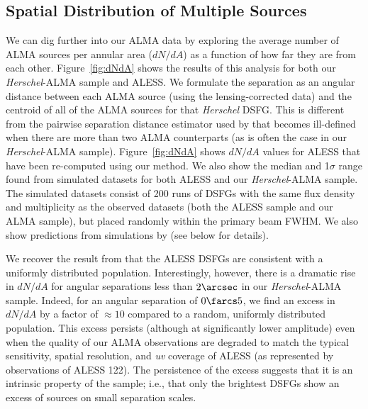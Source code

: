 \documentclass[iop]{emulateapj}
\begin{document}
\subsection{Spatial Distribution of Multiple Sources}\label{sec:spatialdist}

We can dig further into our ALMA data by exploring the average number of ALMA
sources per annular area ($dN/dA$) as a function of how far they are from each
other.  Figure~\ref{fig:dNdA} shows the results of this analysis for both our
{\it Herschel}-ALMA sample and ALESS.  We formulate the separation as an
angular distance between each ALMA source (using the lensing-corrected data)
and the centroid of all of the ALMA sources for that {\it Herschel} DSFG.  This
is different from the pairwise separation distance estimator used by
\citet{Hodge:2013qy} that becomes ill-defined when there are more than two ALMA
counterparts (as is often the case in our {\it Herschel}-ALMA sample).
Figure~\ref{fig:dNdA} shows $dN/dA$ values for ALESS that have been re-computed
using our method.  We also show the median and 1$\sigma$ range found from
simulated datasets for both ALESS and our {\it Herschel}-ALMA sample.  The
simulated datasets consist of 200 runs of DSFGs with the same flux density and
multiplicity as the observed datasets (both the ALESS sample and our ALMA
sample), but placed randomly within the primary beam FWHM.  We also show
predictions from simulations by \citet{HB13} (see below for details).

We recover the result from \citet{Hodge:2013qy} that the ALESS DSFGs are
consistent with a uniformly distributed population.  Interestingly, however,
there is a dramatic rise in $dN/dA$ for angular separations less than
$2\arcsec$ in our {\it Herschel}-ALMA sample.  Indeed, for an angular
separation of $0\farcs5$, we find an excess in $dN/dA$ by a factor of $\approx
10$ compared to a random, uniformly distributed population.  This excess
persists (although at significantly lower amplitude) even when the quality of
our ALMA observations are degraded to match the typical sensitivity, spatial
resolution, and {\it uv} coverage of ALESS (as represented by observations of
ALESS 122).  The persistence of the excess suggests that it is an intrinsic
property of the sample; i.e., that only the brightest DSFGs show an excess of
sources on small separation scales.  
\end{document}
